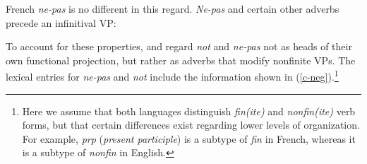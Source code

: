 \documentclass[output=paper
                ,modfonts
                		,nonflat
	        ,collection
	        ,collectionchapter
	        ,collectiontoclongg
 	        ,biblatex
                ,babelshorthands
                ,newtxmath
                ,draftmode
                ,colorlinks, citecolor=brown
]{./langsci/langscibook}
\begin{document}
{\begin{exe}
\begin{xlist}
\begin{exe}
\begin{xlist}
\eal\label{31}
\zl

\noindent
French \textit{ne-pas} is no different in this regard.  \textit{Ne-pas} and
certain other adverbs precede an infinitival VP:

\eal
{}
\zl

To account for these properties, \citet{Kim:00} and \citet{KS:02} regard \textit{not} and \textit{ne-pas} not as heads of their own functional projection, but rather as adverbs that modify
nonfinite VPs. The lexical entries for \textit{ne-pas} and \textit{not} include the
information shown in (\ref{c-neg}).\footnote{Here we assume that both languages
distinguish \textit{fin(ite)} and \textit{nonfin(ite)} verb forms, but that
certain differences exist regarding lower levels of organization. For example,
\textit{prp} (\textit{present participle}) is a subtype of \textit{fin} in French,
whereas it is a subtype of \textit{nonfin} in English.}

%


\end{xlist}
\end{exe}
\end{xlist}
\end{exe}}
\end{document}
